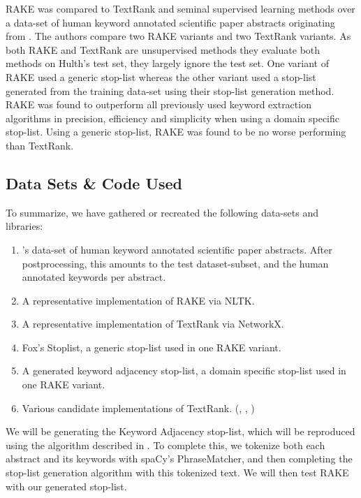 \documentclass[11pt,a4paper]{article}
\begin{document}
RAKE was compared to TextRank and seminal supervised learning methods \citep{hulth-2003-improved} over a data-set of human keyword annotated scientific paper abstracts originating from \citet{hulth-2003-improved}. The authors compare two RAKE variants and two TextRank variants. As both RAKE and TextRank are unsupervised methods they evaluate both methods on Hulth's test set, they largely ignore the test set. One variant of RAKE used a generic stop-list whereas the other variant used a stop-list generated from the training data-set using their stop-list generation method. RAKE was found to outperform all previously used keyword extraction algorithms in precision, efficiency and simplicity when using a domain specific stop-list. Using a generic stop-list, RAKE was found to be no worse performing than TextRank.

\subsection{Data Sets \& Code Used}
To summarize, we have gathered or recreated the following data-sets and libraries:

\begin{enumerate}
	\small \itemsep0em 

	\item \citet{hulth-2003-improved}'s data-set of human keyword annotated scientific paper abstracts. After postprocessing, this amounts to the test dataset-subset, and the human annotated keywords per abstract.
	\item A representative implementation of RAKE via NLTK. \citet{2}
	\item A representative implementation of TextRank via NetworkX. \citet{PyTextRank}
	\item Fox's Stoplist, a generic stop-list used in one RAKE variant.
	\item A generated keyword adjacency stop-list, a domain specific stop-list used in one RAKE variant.	
	\item Various candidate implementations of TextRank. (\citet{TextRank-alt1}, \citet{TextRank-alt2}, \citet{TextRank-alt3})

	\normalsize
\end{enumerate}  

We will be generating the Keyword Adjacency stop-list, which will be reproduced using the algorithm described in \citet{1}. To complete this, we tokenize both each abstract and its keywords with spaCy's PhraseMatcher, and then completing the stop-list generation algorithm with this tokenized text. We will then test RAKE with our generated stop-list. 
\end{document}
